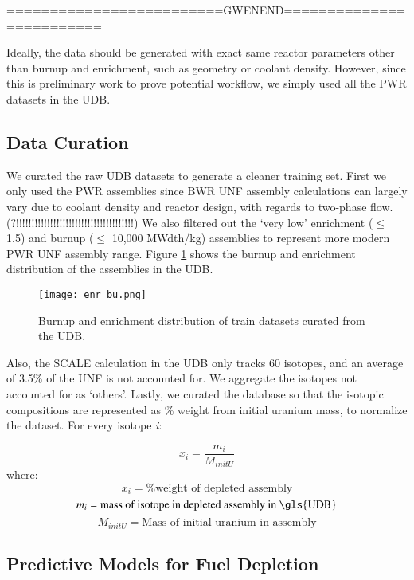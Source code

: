 =========================GWENEND=========================

Ideally, the data should be generated with exact same reactor
parameters other than burnup and enrichment, such as geometry or
coolant density. However, since
this is preliminary work to prove potential workflow, we
simply used all the \gls{PWR} datasets in the \gls{UDB}.

\subsection{Data Curation}

We curated the raw \gls{UDB} datasets to generate
a cleaner training set. First we only used the 
\gls{PWR} assemblies since \gls{BWR} \gls{UNF} assembly
calculations can largely vary due to coolant density
and reactor design, with regards to two-phase flow. 
(?!!!!!!!!!!!!!!!!!!!!!!!!!!!!!!!!!!!!!!)
We also filtered out the
`very low' enrichment ($\leq$ 1.5) and burnup ($\leq$ 10,000 MWdth/kg)
assemblies to represent more modern \gls{PWR} \gls{UNF}
assembly range. Figure \ref{fig:enr_bu} shows the
burnup and enrichment distribution of the assemblies in the
\gls{UDB}.


\begin{figure}
    \centering
    \texttt{[image: enr\_bu.png]}
    \caption{Burnup and enrichment distribution of train
             datasets curated from the \gls{UDB}.}
    \label{fig:enr_bu}
\end{figure}


Also, the SCALE calculation in the \gls{UDB} only tracks 60 isotopes,
and an average of 3.5\% of the \gls{UNF} is not accounted for. We
aggregate the isotopes not accounted for as `others'. Lastly,
we curated the database so that the isotopic compositions are 
represented as \% weight from initial uranium mass, to normalize
the dataset. For every isotope \textit{i}:

\begin{equation}
x_i = \frac{m_i}{M_{initU}}
\end{equation}
where:
\[
x_i = \text{\% weight of depleted assembly}
\]
\[
m_i = \text{mass of isotope in depleted assembly in \gls{UDB}}
\]
\[
M_{initU} = \text{Mass of initial uranium in assembly}
\]


\subsection{Predictive Models for Fuel Depletion}

